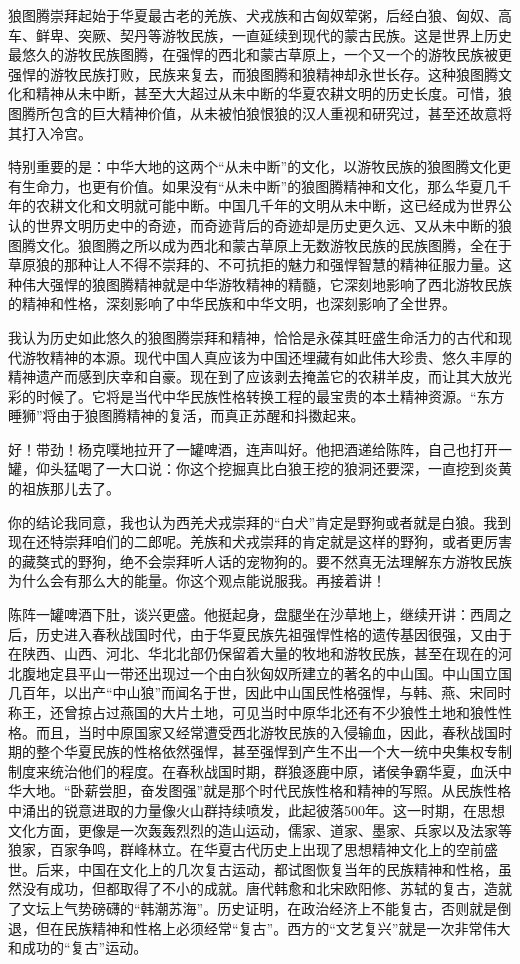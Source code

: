 \par 狼图腾崇拜起始于华夏最古老的羌族、犬戎族和古匈奴荤粥，后经白狼、匈奴、高车、鲜卑、突厥、契丹等游牧民族，一直延续到现代的蒙古民族。这是世界上历史最悠久的游牧民族图腾，在强悍的西北和蒙古草原上，一个又一个的游牧民族被更强悍的游牧民族打败，民族来复去，而狼图腾和狼精神却永世长存。这种狼图腾文化和精神从未中断，甚至大大超过从未中断的华夏农耕文明的历史长度。可惜，狼图腾所包含的巨大精神价值，从未被怕狼恨狼的汉人重视和研究过，甚至还故意将其打入冷宫。
\par 特别重要的是：中华大地的这两个“从未中断”的文化，以游牧民族的狼图腾文化更有生命力，也更有价值。如果没有“从未中断”的狼图腾精神和文化，那么华夏几千年的农耕文化和文明就可能中断。中国几千年的文明从未中断，这已经成为世界公认的世界文明历史中的奇迹，而奇迹背后的奇迹却是历史更久远、又从未中断的狼图腾文化。狼图腾之所以成为西北和蒙古草原上无数游牧民族的民族图腾，全在于草原狼的那种让人不得不崇拜的、不可抗拒的魅力和强悍智慧的精神征服力量。这种伟大强悍的狼图腾精神就是中华游牧精神的精髓，它深刻地影响了西北游牧民族的精神和性格，深刻影响了中华民族和中华文明，也深刻影响了全世界。
\par 我认为历史如此悠久的狼图腾崇拜和精神，恰恰是永葆其旺盛生命活力的古代和现代游牧精神的本源。现代中国人真应该为中国还埋藏有如此伟大珍贵、悠久丰厚的精神遗产而感到庆幸和自豪。现在到了应该剥去掩盖它的农耕羊皮，而让其大放光彩的时候了。它将是当代中华民族性格转换工程的最宝贵的本土精神资源。“东方睡狮”将由于狼图腾精神的复活，而真正苏醒和抖擞起来。
\par 
\par 好！带劲！杨克噗地拉开了一罐啤酒，连声叫好。他把酒递给陈阵，自己也打开一罐，仰头猛喝了一大口说：你这个挖掘真比白狼王挖的狼洞还要深，一直挖到炎黄的祖族那儿去了。
\par 你的结论我同意，我也认为西羌犬戎崇拜的“白犬”肯定是野狗或者就是白狼。我到现在还特崇拜咱们的二郎呢。羌族和犬戎崇拜的肯定就是这样的野狗，或者更厉害的藏獒式的野狗，绝不会崇拜听人话的宠物狗的。要不然真无法理解东方游牧民族为什么会有那么大的能量。你这个观点能说服我。再接着讲！
\par 陈阵一罐啤酒下肚，谈兴更盛。他挺起身，盘腿坐在沙草地上，继续开讲：西周之后，历史进入春秋战国时代，由于华夏民族先祖强悍性格的遗传基因很强，又由于在陕西、山西、河北、华北北部仍保留着大量的牧地和游牧民族，甚至在现在的河北腹地定县平山一带还出现过一个由白狄匈奴所建立的著名的中山国。中山国立国几百年，以出产“中山狼”而闻名于世，因此中山国民性格强悍，与韩、燕、宋同时称王，还曾掠占过燕国的大片土地，可见当时中原华北还有不少狼性土地和狼性性格。而且，当时中原国家又经常遭受西北游牧民族的入侵输血，因此，春秋战国时期的整个华夏民族的性格依然强悍，甚至强悍到产生不出一个大一统中央集权专制制度来统治他们的程度。在春秋战国时期，群狼逐鹿中原，诸侯争霸华夏，血沃中华大地。“卧薪尝胆，奋发图强”就是那个时代民族性格和精神的写照。从民族性格中涌出的锐意进取的力量像火山群持续喷发，此起彼落500年。这一时期，在思想文化方面，更像是一次轰轰烈烈的造山运动，儒家、道家、墨家、兵家以及法家等狼家，百家争鸣，群峰林立。在华夏古代历史上出现了思想精神文化上的空前盛世。后来，中国在文化上的几次复古运动，都试图恢复当年的民族精神和性格，虽然没有成功，但都取得了不小的成就。唐代韩愈和北宋欧阳修、苏轼的复古，造就了文坛上气势磅礴的“韩潮苏海”。历史证明，在政治经济上不能复古，否则就是倒退，但在民族精神和性格上必须经常“复古”。西方的“文艺复兴”就是一次非常伟大和成功的“复古”运动。
